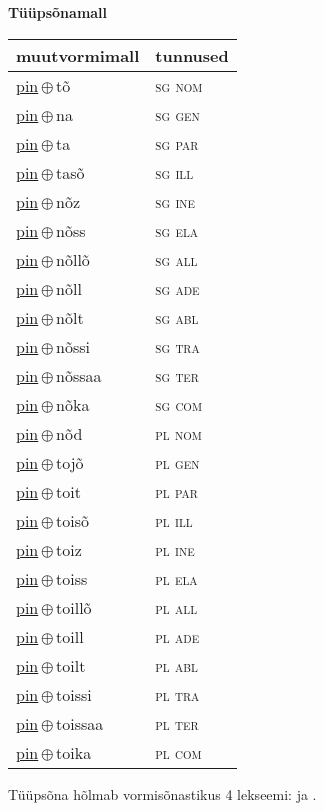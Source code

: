 

\vspace{3.5em}
\noindent \begin{minipage}{\textwidth}
\noindent \textbf{Tüüpsõnamall \,}\\

\begin{sideways}
\begin{tabular}{l l}
muutvormimall & tunnused \\
\hline
\underline{pin}\,$\oplus$\,tõ & \textsc{ sg nom } \\
\underline{pin}\,$\oplus$\,na & \textsc{ sg gen } \\
\underline{pin}\,$\oplus$\,ta & \textsc{ sg par } \\
\underline{pin}\,$\oplus$\,tasõ & \textsc{ sg ill } \\
\underline{pin}\,$\oplus$\,nõz & \textsc{ sg ine } \\
\underline{pin}\,$\oplus$\,nõss & \textsc{ sg ela } \\
\underline{pin}\,$\oplus$\,nõllõ & \textsc{ sg all } \\
\underline{pin}\,$\oplus$\,nõll & \textsc{ sg ade } \\
\underline{pin}\,$\oplus$\,nõlt & \textsc{ sg abl } \\
\underline{pin}\,$\oplus$\,nõssi & \textsc{ sg tra } \\
\underline{pin}\,$\oplus$\,nõssaa & \textsc{ sg ter } \\
\underline{pin}\,$\oplus$\,nõka & \textsc{ sg com } \\
\underline{pin}\,$\oplus$\,nõd & \textsc{ pl nom } \\
\underline{pin}\,$\oplus$\,tojõ & \textsc{ pl gen } \\
\underline{pin}\,$\oplus$\,toit & \textsc{ pl par } \\
\underline{pin}\,$\oplus$\,toisõ & \textsc{ pl ill } \\
\underline{pin}\,$\oplus$\,toiz & \textsc{ pl ine } \\
\underline{pin}\,$\oplus$\,toiss & \textsc{ pl ela } \\
\underline{pin}\,$\oplus$\,toillõ & \textsc{ pl all } \\
\underline{pin}\,$\oplus$\,toill & \textsc{ pl ade } \\
\underline{pin}\,$\oplus$\,toilt & \textsc{ pl abl } \\
\underline{pin}\,$\oplus$\,toissi & \textsc{ pl tra } \\
\underline{pin}\,$\oplus$\,toissaa & \textsc{ pl ter } \\
\underline{pin}\,$\oplus$\,toika & \textsc{ pl com } \\
\end{tabular}
\end{sideways}
\label{tab:tüüpsõnamall-pintõ}

\end{minipage}

 
\vspace{1em}
\noindent Tüüpsõna hõlmab vormisõnastikus 4 lekseemi:  ja .
